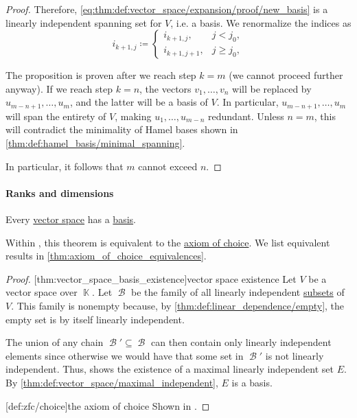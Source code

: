 \begin{proof}
  Therefore, \eqref{eq:thm:def:vector_space/expansion/proof/new_basis} is a linearly independent spanning set for \( V \), i.e. a basis. We renormalize the indices as
  \begin{equation*}
    i_{k+1,j} \coloneqq \begin{cases}
      i_{k+1,j},   &j < j_0, \\
      i_{k+1,j+1}, &j \geq j_0,
    \end{cases}
  \end{equation*}

  The proposition is proven after we reach step \( k = m \) (we cannot proceed further anyway). If we reach step \( k = n \), the vectors \( v_1, \ldots, v_n \) will be replaced by \( u_{m-n+1}, \ldots, u_m \), and the latter will be a basis of \( V \). In particular, \( u_{m-n+1}, \ldots, u_m \) will span the entirety of \( V \), making \( u_1, \ldots, u_{m-n} \) redundant. Unless \( n = m \), this will contradict the minimality of Hamel bases shown in \cref{thm:def:hamel_basis/minimal_spanning}.

  In particular, it follows that \( m \) cannot exceed \( n \).
\end{proof}

\paragraph{Ranks and dimensions}

\begin{theorem}\label{thm:vector_space_basis_existence}
  Every \hyperref[def:vector_space]{vector space} has a \hyperref[def:hamel_basis]{basis}.
\end{theorem}
\begin{comments}
  \item Within \hyperref[def:zfc]{}, this theorem is equivalent to the \hyperref[def:zfc/choice]{axiom of choice}. We list equivalent results in \cref{thm:axiom_of_choice_equivalences}.
\end{comments}
\begin{proof}
  [thm:vector_space_basis_existence]{vector space existence} Let \( V \) be a vector space over \( \BbbK \). Let \( \mscrB \) be the family of all linearly independent \hyperref[def:linear_combination]{subsets} of \( V \). This family is nonempty because, by \cref{thm:def:linear_dependence/empty}, the empty set is by itself linearly independent.

  The union of any chain \( \mscrB' \subseteq \mscrB \) can then contain only linearly independent elements since otherwise we would have that some set in \( \mscrB' \) is not linearly independent. Thus,  shows the existence of a maximal linearly independent set \( E \). By \cref{thm:def:vector_space/maximal_independent}, \( E \) is a basis.

  [def:zfc/choice]{the axiom of choice} Shown in \cite{Blass1984BasesImplyAOC}.
\end{proof}

